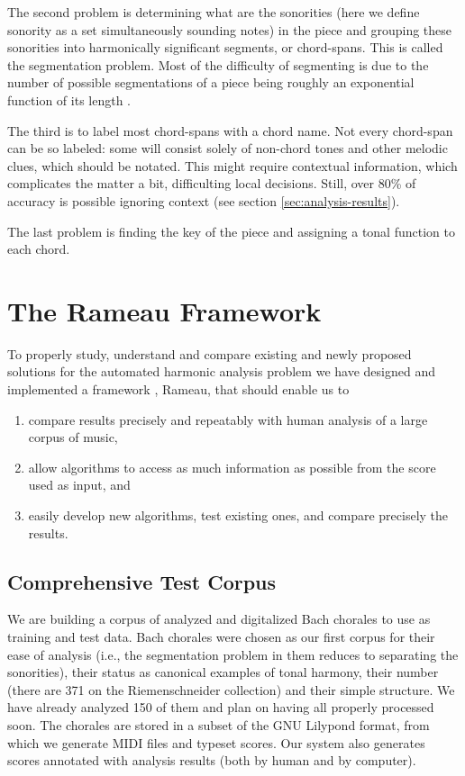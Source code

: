 \documentclass{article}
\begin{document}
The second problem is determining what are the sonorities (here we
define sonority as a set simultaneously sounding notes) in the piece
and grouping these sonorities into harmonically significant segments,
or chord-spans. This is called the segmentation problem. Most of the
difficulty of segmenting is due to the number of possible
segmentations of a piece being roughly an exponential function of its
length \cite{pardo02:algorithms}.

The third is to label most chord-spans with a chord name. Not every
chord-span can be so labeled: some will consist solely of non-chord
tones and other melodic clues, which should be notated. This might
require contextual information, which complicates the matter a bit,
difficulting local decisions. Still, over 80\% of accuracy is
possible ignoring context (see section \ref{sec:analysis-results}).

The last problem is finding the key of the piece and assigning a tonal
function to each chord.

\section{The Rameau Framework}
\label{sec:system}

To properly study, understand and compare existing and newly proposed
solutions for the automated harmonic analysis problem we have designed
and implemented a framework , Rameau, that should enable us to

\begin{enumerate}
\item compare results precisely and repeatably with human analysis of
  a large corpus of music,
\item allow algorithms to access as much information as possible from
  the score used as input, and
\item easily develop new algorithms, test existing ones, and compare
  precisely the results.
\end{enumerate}

\subsection{Comprehensive Test Corpus}
\label{sec:comprehensive-test-corpus}

We are building a corpus of analyzed and digitalized Bach chorales to
use as training and test data. Bach chorales were chosen as our first
corpus for their ease of analysis (i.e., the segmentation problem in
them reduces to separating the sonorities), their status as canonical
examples of tonal harmony, their number (there are 371 on the
Riemenschneider collection) and their simple structure. We have
already analyzed 150 of them and plan on having all properly processed
soon. The chorales are stored in a subset of the GNU Lilypond
\cite{nienhuys:lilypond} format, from which we generate MIDI files and
typeset scores. Our system also generates scores annotated with
analysis results (both by human and by computer).
\end{document}
